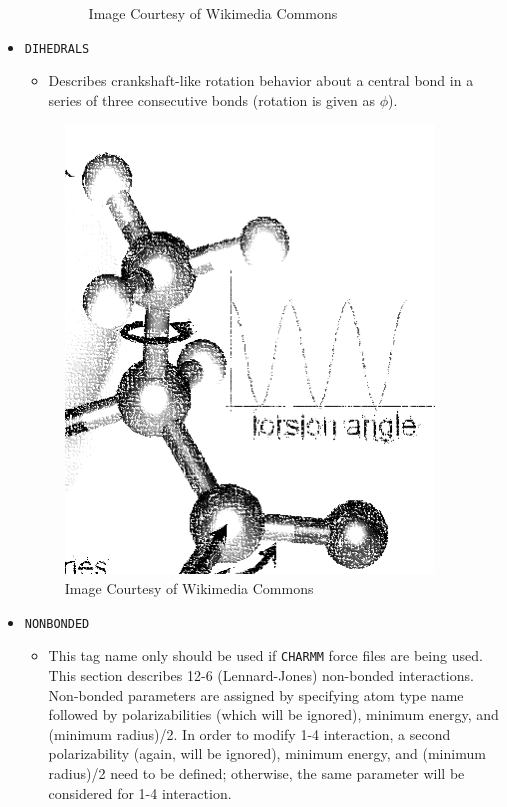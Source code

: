 \begin{itemize}
\begin{itemize}
\begin{figure}[H]
\caption{Image Courtesy of Wikimedia Commons}
\end{figure}
\end{itemize}
\item \texttt{DIHEDRALS} 
\begin{itemize}
\item Describes crankshaft-like rotation behavior about a central bond in a series of three consecutive bonds (rotation is given as $\phi$).
\end{itemize}
\begin{figure}[H]
\centering
\includegraphics[scale=1.0]{images/dihedrals}
\caption{Image Courtesy of Wikimedia Commons}
\end{figure}
\item \texttt{NONBONDED}
\begin{itemize}
\item This tag name only should be used if \texttt{CHARMM} force files are being used. This section describes 12-6 (Lennard-Jones) non-bonded interactions. Non-bonded parameters are assigned by specifying atom type name followed by polarizabilities (which will be ignored), minimum energy, and (minimum radius)/2. In order to modify 1-4 interaction, a second polarizability (again, will be ignored), minimum energy, and (minimum radius)/2 need to be defined; otherwise, the same parameter will be considered for 1-4 interaction.
\end{itemize}
\begin{figure}[H]

\end{figure}
\end{itemize}

